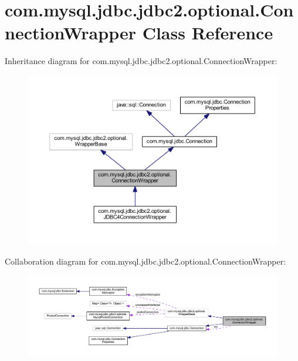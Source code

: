 \hypertarget{classcom_1_1mysql_1_1jdbc_1_1jdbc2_1_1optional_1_1_connection_wrapper}{}\section{com.\+mysql.\+jdbc.\+jdbc2.\+optional.\+Connection\+Wrapper Class Reference}
\label{classcom_1_1mysql_1_1jdbc_1_1jdbc2_1_1optional_1_1_connection_wrapper}


Inheritance diagram for com.\+mysql.\+jdbc.\+jdbc2.\+optional.\+Connection\+Wrapper\+:
\nopagebreak
\begin{figure}[H]
\begin{center}
\leavevmode
\includegraphics[width=350pt]{classcom_1_1mysql_1_1jdbc_1_1jdbc2_1_1optional_1_1_connection_wrapper__inherit__graph}
\end{center}
\end{figure}


Collaboration diagram for com.\+mysql.\+jdbc.\+jdbc2.\+optional.\+Connection\+Wrapper\+:
\nopagebreak
\begin{figure}[H]
\begin{center}
\leavevmode
\includegraphics[width=350pt]{classcom_1_1mysql_1_1jdbc_1_1jdbc2_1_1optional_1_1_connection_wrapper__coll__graph}
\end{center}
\end{figure}
